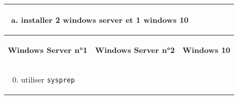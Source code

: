 \documentclass[a4paper]{article}
\begin{document}
\begin{center}
    \begin{tabular}{|p{5cm}|p{5cm}|p{5cm}|} \hline

        \multicolumn{3}{|p{15cm}|}{
            \begin{enumerate}[(a)]
                \item installer 2 windows server et 1 windows 10
            \end{enumerate}
        }

        \\ \hline

        \begin{center} \textbf{Windows Server n°1} \end{center} &
        \begin{center} \textbf{Windows Server n°2} \end{center} &
        \begin{center} \textbf{Windows 10} \end{center} \\ \hline

        \begin{enumerate} \setcounter{enumi}{-1}
            \item utiliser \texttt{sysprep}
        \end{enumerate}

        && \\ \hline


\end{tabular}
\end{center}
\end{document}
